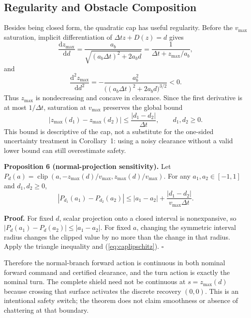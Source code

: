 \documentclass[letterpaper]{article}
\begin{document}
\subsection{Regularity and Obstacle Composition}

Besides being closed form, the quadratic cap has useful regularity.  Before
the $v_{\max}$ saturation, implicit differentiation of
$\Delta t z+D(z)=d$ gives
\begin{equation}
 \frac{\mathrm d z_{\max}}{\mathrm d d}
 =\frac{a_b}{\sqrt{(a_b\Delta t)^2+2a_bd}}
 =\frac{1}{\Delta t+z_{\max}/a_b},                     \label{eq:capderivative}
\end{equation}
and
\begin{equation}
 \frac{\mathrm d^2 z_{\max}}{\mathrm d d^2}
 =-\frac{a_b^2}{\bigl((a_b\Delta t)^2+2a_bd\bigr)^{3/2}}<0. \label{eq:capconcavity}
\end{equation}
Thus $z_{\max}$ is nondecreasing and concave in clearance.  Since the first
derivative is at most $1/\Delta t$, saturation at $v_{\max}$ preserves the
global bound
\begin{equation}
 |z_{\max}(d_1)-z_{\max}(d_2)|
 \le\frac{|d_1-d_2|}{\Delta t},
 \qquad d_1,d_2\ge0.                                    \label{eq:caplipschitz}
\end{equation}
This bound is descriptive of the cap, not a substitute for the one-sided
uncertainty treatment in Corollary~1: using a noisy clearance without a valid
lower bound can still overestimate safety.

\textbf{Proposition 6 (normal-projection sensitivity).}
Let $P_d(a)=\operatorname{clip}(a,-z_{\max}(d)/v_{\max},
z_{\max}(d)/v_{\max})$.  For any $a_1,a_2\in[-1,1]$ and
$d_1,d_2\ge0$,
\begin{equation}
 |P_{d_1}(a_1)-P_{d_2}(a_2)|
 \le |a_1-a_2|+
 \frac{|d_1-d_2|}{v_{\max}\Delta t}.                  \label{eq:projsensitivity}
\end{equation}

\textbf{Proof.}
For fixed $d$, scalar projection onto a closed interval is nonexpansive, so
$|P_d(a_1)-P_d(a_2)|\le|a_1-a_2|$.  For fixed $a$, changing the symmetric
interval radius changes the clipped value by no more than the change in that
radius.  Apply the triangle inequality and (\ref{eq:caplipschitz}). $\square$

Therefore the normal-branch forward action is continuous in both nominal
forward command and certified clearance, and the turn action is exactly the
nominal turn.  The complete shield need not be continuous at
$s=z_{\max}(d)$ because crossing that surface activates the discrete recovery
$(0,0)$.  This is an intentional safety switch; the theorem does not claim
smoothness or absence of chattering at that boundary.
\end{document}
